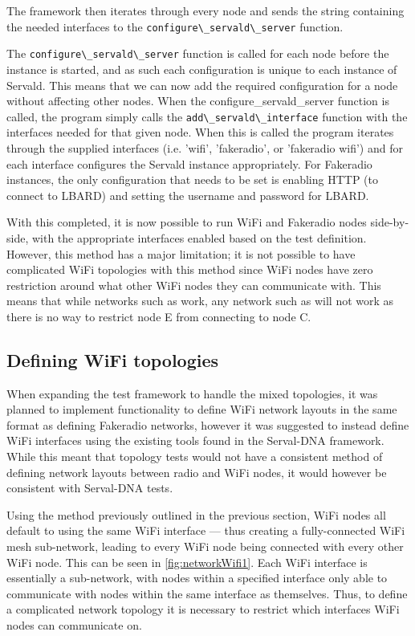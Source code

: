 The framework then iterates through every node and sends the string containing the needed interfaces to the \verb|configure\_servald\_server| function.


The \verb|configure\_servald\_server| function is called for each node before the instance is started, and as such each configuration is unique to each instance of Servald.
This means that we can now add the required configuration for a node without affecting other nodes.
When the configure\_servald\_server function is called, the program simply calls the \verb|add\_servald\_interface| function with the interfaces needed for that given node.
When this is called the program iterates through the supplied interfaces (i.e. 'wifi', 'fakeradio', or 'fakeradio wifi') and for each interface configures the Servald instance appropriately.
For Fakeradio instances, the only configuration that needs to be set is enabling HTTP (to connect to LBARD) and setting the username and password for LBARD.

With this completed, it is now possible to run WiFi and Fakeradio nodes side-by-side, with the appropriate interfaces enabled based on the test definition.
However, this method has a major limitation; it is not possible to have complicated WiFi topologies with this method since WiFi nodes have zero restriction around what other WiFi nodes they can communicate with.
This means that while networks such as  work, any network such as  will not work as there is no way to restrict node E from connecting to node C.



\subsection{Defining WiFi topologies}
When expanding the test framework to handle the mixed topologies, it was planned to implement functionality to define WiFi network layouts in the same format as defining Fakeradio networks, however it was suggested to instead define WiFi interfaces using the existing tools found in the Serval-DNA framework.
While this meant that topology tests would not have a consistent method of defining network layouts between radio and WiFi nodes, it would however be consistent with Serval-DNA tests.

Using the method previously outlined in the previous section, WiFi nodes all default to using the same WiFi interface — thus creating a fully-connected WiFi mesh sub-network, leading to every WiFi node being connected with every other WiFi node.
This can be seen in \figurename{ \ref{fig:networkWifi1}}.
Each WiFi interface is essentially a sub-network, with nodes within a specified interface only able to communicate with nodes within the same interface as themselves.
Thus, to define a complicated network topology it is necessary to restrict which interfaces WiFi nodes can communicate on.

